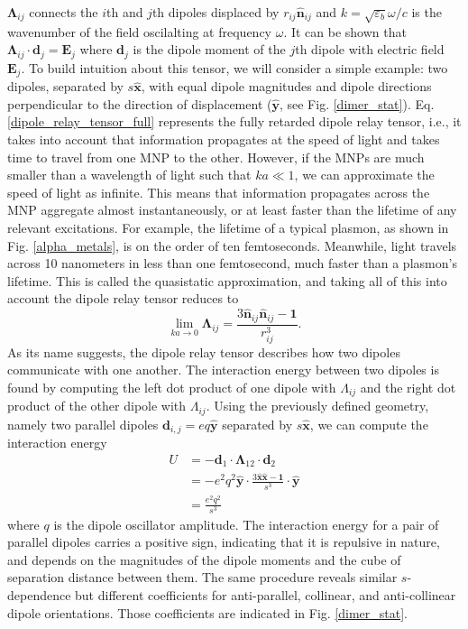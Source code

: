 \documentclass [11pt, proquest] {uwthesis}[2016/11/22]
\begin{document}
$\boldsymbol{\Lambda}_{ij}$ connects the $i$th and $j$th dipoles displaced by $r_{ij}\hat{\textbf{n}}_{ij}$ and $k=\sqrt{\varepsilon_b}\omega/c$ is the wavenumber of the field oscilalting at frequency $\omega$. It can be shown that $\boldsymbol{\Lambda}_{ij}\cdot\textbf{d}_j = \textbf{E}_j$ where $\textbf{d}_j$ is the dipole moment of the $j$th dipole with electric field $\textbf{E}_j$. To build intuition about this tensor, we will consider a simple example: two dipoles, separated by $s\hat{\textbf{x}}$, with equal dipole magnitudes and dipole directions perpendicular to the direction of displacement ($\hat{\textbf{y}}$, see Fig. \ref{dimer_stat}). Eq. \ref{dipole_relay_tensor_full} represents the fully retarded dipole relay tensor, i.e., it takes into account that information propagates at the speed of light and takes time to travel from one MNP to the other. However, if the MNPs are much smaller than a wavelength of light such that $ka \ll 1$, we can approximate the speed of light as infinite. This means that information propagates across the MNP aggregate almost instantaneously, or at least faster than the lifetime of any relevant excitations. For example, the lifetime of a typical plasmon, as shown in Fig. \ref{alpha_metals}, is on the order of ten femtoseconds. Meanwhile, light travels across 10 nanometers in less than one femtosecond, much faster than a plasmon's lifetime. This is called the quasistatic approximation, and taking all of this into account the dipole relay tensor reduces to
\begin{equation}
\lim_{ka \to 0}\boldsymbol{\Lambda}_{ij} =  \frac{3\hat{\textbf{n}}_{ij}\hat{\textbf{n}}_{ij} - \textbf{1}}{r_{ij}^3}.
\end{equation}
As its name suggests, the dipole relay tensor describes how two dipoles communicate with one another. The interaction energy between two dipoles is found by computing the left dot product of one dipole with $\Lambda_{ij}$ and the right dot product of the other dipole with $\Lambda_{ij}$. Using the previously defined geometry, namely two parallel dipoles $\textbf{d}_{i,j} = eq\hat{\textbf{y}}$ separated by $s\hat{\textbf{x}}$, we can compute the interaction energy
\begin{equation}
\begin{split}
U &= -\textbf{d}_1\cdot\boldsymbol{\Lambda}_{12}\cdot\textbf{d}_2\\
&= -e^2q^2\hat{\textbf{y}}\cdot\frac{3\hat{\textbf{x}}\hat{\textbf{x}} - \textbf{1}}{s^3}\cdot\hat{\textbf{y}}\\
&= \frac{e^2q^2}{s^3}
\label{quasi_int}
\end{split}
\end{equation}
where $q$ is the dipole oscillator amplitude. The interaction energy for a pair of parallel dipoles carries a positive sign, indicating that it is repulsive in nature, and depends on the magnitudes of the dipole moments and the cube of separation distance between them. The same procedure reveals similar $s$-dependence but different coefficients for anti-parallel, collinear, and anti-collinear dipole orientations. Those coefficients are indicated in Fig. \ref{dimer_stat}.
\end{document}
